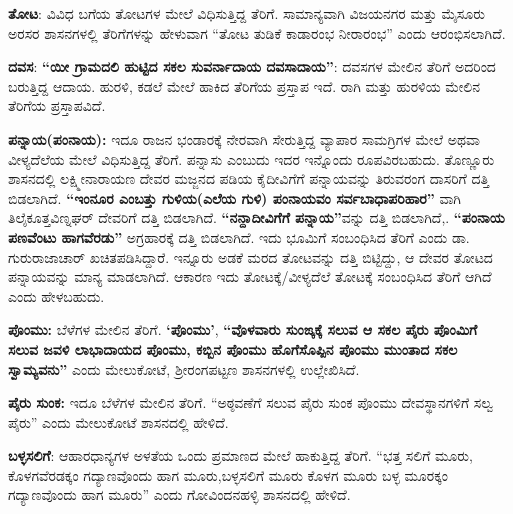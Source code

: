\textbf{ತೋಟ}: ವಿವಿಧ ಬಗೆಯ ತೋಟಗಳ ಮೇಲೆ ವಿಧಿಸುತ್ತಿದ್ದ ತೆರಿಗೆ. ಸಾಮಾನ್ಯವಾಗಿ ವಿಜಯನಗರ ಮತ್ತು ಮೈಸೂರು ಅರಸರ ಶಾಸನಗಳಲ್ಲಿ ತೆರಿಗೆಗಳನ್ನು ಹೇಳುವಾಗ “ತೋಟ ತುಡಿಕೆ ಕಾಡಾರಂಭ ನೀರಾರಂಭ” ಎಂದು ಆರಂಭಿಸಲಾಗಿದೆ.

\textbf{ದವಸ}: \textbf{“ಯೀ ಗ್ರಾಮದಲಿ ಹುಟ್ಟಿದ ಸಕಲ ಸುವರ್ನಾದಾಯ ದವಸಾದಾಯ”}: ದವಸಗಳ ಮೇಲಿನ ತೆರಿಗೆ ಅದರಿಂದ ಬರುತ್ತಿದ್ದ ಆದಾಯ. ಹುರಳಿ, ಕಡಲೆ ಮೇಲೆ ಹಾಕಿದ ತೆರಿಗೆಯ ಪ್ರಸ್ತಾಪ ಇದೆ. ರಾಗಿ ಮತ್ತು ಹುರಳಿಯ ಮೇಲಿನ ತೆರಿಗೆಯ ಪ್ರಸ್ತಾಪವಿದೆ.

\textbf{ಪನ್ನಾಯ(ಪಂನಾಯ):} ಇದೂ ರಾಜನ ಭಂಡಾರಕ್ಕೆ ನೇರವಾಗಿ ಸೇರುತ್ತಿದ್ದ ವ್ಯಾಪಾರ ಸಾಮಗ್ರಿಗಳ ಮೇಲೆ ಅಥವಾ ವೀಳ್ಯದೆಲೆಯ ಮೇಲೆ ವಿಧಿಸುತ್ತಿದ್ದ ತೆರಿಗೆ. ಪನ್ನಾಸು ಎಂಬುದು ಇದರ ಇನ್ನೊಂದು ರೂಪವಿರಬಹುದು. ತೊಣ್ಣೂರು ಶಾಸನದಲ್ಲಿ ಲಕ್ಷ್ಮೀನಾರಾಯಣ ದೇವರ ಮಜ್ಜನದ ಪಡಿಯ ಕೈದೀವಿಗೆಗೆ ಪನ್ನಾಯವನ್ನು ತಿರುವರಂಗ ದಾಸರಿಗೆ ದತ್ತಿ ಬಿಡಲಾಗಿದೆ.\textbf{ “ಇಂನೂರ ಎಂಬತ್ತು ಗುಳಿಯ(ಎಲೆಯ ಗುಳಿ) ಪಂನಾಯವಂ ಸರ್ವಬಾಧಾಪರಿಹಾರ”} ವಾಗಿ ತಿಲೈಕೂತ್ತವಿಣ್ನಘರ್​ ದೇವರಿಗೆ ದತ್ತಿ ಬಿಡಲಾಗಿದೆ.\textbf{ “ನನ್ದಾದೀವಿಗೆಗೆ ಪನ್ನಾಯ”}ವನ್ನು ದತ್ತಿ ಬಿಡಲಾಗಿದೆ,. \textbf{ “ಪಂನಾಯ ಪಣವೆಂಟು ಹಾಗವೆರಡು”} ಅಗ್ರಹಾರಕ್ಕೆ ದತ್ತಿ ಬಿಡಲಾಗಿದೆ. ಇದು ಭೂಮಿಗೆ ಸಂಬಂಧಿಸಿದ ತೆರಿಗೆ ಎಂದು ಡಾ. ಗುರುರಾಜಾಚಾರ್​ ಖಚಿತಪಡಿಸಿದ್ದಾರೆ. ಇನ್ನೂರು ಅಡಕೆ ಮರದ ತೋಟವನ್ನು ದತ್ತಿ ಬಿಟ್ಟಿದ್ದು, ಆ ದೇವರ ತೋಟದ ಪನ್ನಾಯವನ್ನು ಮಾನ್ಯ ಮಾಡಲಾಗಿದೆ. ಆಕಾರಣ ಇದು ತೋಟಕ್ಕೆ/ವೀಳ್ಯದೆಲೆ ತೋಟಕ್ಕೆ ಸಂಬಂಧಿಸಿದ ತೆರಿಗೆ ಆಗಿದೆ ಎಂದು ಹೇಳಬಹುದು.

\textbf{ಪೊಂಮು:} ಬೆಳೆಗಳ ಮೇಲಿನ ತೆರಿಗೆ.\textbf{ ‘ಪೊಂಮು’},\textbf{ “ವೊಳವಾರು ಸುಂಙ್ಕಕ್ಕೆ ಸಲುವ ಆ ಸಕಲ ಪೈರು ಪೊಂಮಿಗೆ ಸಲುವ ಜವಳಿ ಲಾಭಾದಾಯದ ಪೊಂಮು, ಕಬ್ಬಿನ ಪೊಂಮು ಹೊಗೆಸೊಪ್ಪಿನ ಪೊಂಮು ಮುಂತಾದ ಸಕಲ ಸ್ವಾಮ್ಯವನು”} ಎಂದು ಮೇಲುಕೋಟೆ, ಶ‍್ರೀರಂಗಪಟ್ಟಣ ಶಾಸನಗಳಲ್ಲಿ ಉಲ್ಲೇಖಿಸಿದೆ.

\textbf{ಪೈರು ಸುಂಕ: } ಇದೂ ಬೆಳೆಗಳ ಮೇಲಿನ ತೆರಿಗೆ. “ಅಠ್ಠವಣೆಗೆ ಸಲುವ ಪೈರು ಸುಂಕ ಪೊಂಮು ದೇವಸ್ಥಾನಗಳಿಗೆ ಸಲ್ವ ಪೈರು” ಎಂದು ಮೇಲುಕೋಟೆ ಶಾಸನದಲ್ಲಿ ಹೇಳಿದೆ.

\textbf{ಬಳ್ಳಸಲಿಗೆ}: ಆಹಾರಧಾನ್ಯಗಳ ಅಳತೆಯ ಒಂದು ಪ್ರಮಾಣದ ಮೇಲೆ ಹಾಕುತ್ತಿದ್ದ ತೆರಿಗೆ. “ಭತ್ತ ಸಲಿಗೆ ಮೂರು, ಕೊಳಗವೆರಡಕ್ಕಂ ಗದ್ಯಾಣವೊಂದು ಹಾಗ ಮೂರು,ಬಳ್ಳಸಲಿಗೆ ಮೂರು ಕೊಳಗ ಮೂರು ಬಳ್ಳ ಮೂರಕ್ಕಂ ಗದ್ಯಾಣವೊಂದು ಹಾಗ ಮೂರು” ಎಂದು ಗೋವಿಂದನಹಳ್ಳಿ ಶಾಸನದಲ್ಲಿ ಹೇಳಿದೆ.

